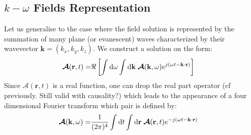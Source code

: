 \subsection{$k-\omega$ Fields Representation}\label{sec:spectralRepresentation}
Let us generalise to the case where the field solution is represented by the summation of many plane (or evanescent) waves characterized by their wavevector $\mathbf{k}=(k_x, k_y, k_z)$. We construct a solution on the form: 	
\begin{subequations}
	\begin{align}
	\boldsymbol{\mathcal{A}}(\mathbf{r}, t) =& \Re \left[
	\int \mathop{}\!\mathrm{d} \omega \int \mathop{}\!\mathrm{d} \mathbf{k} \;
	\mathbf{\boldsymbol{\mathcal{A}}}(\mathbf{k}, \omega) e^{j(\omega t - \mathbf{k}\cdot\mathbf{r})}
	\right]
	\end{align}
	\label{eq:k-spectralDefinition}
\end{subequations}
Since $\boldsymbol{\mathcal{A}}(\mathbf{r}, t)$ is a real function, one can drop the real part operator (cf previously. Still valid with causality?) which leads to the appearance of a four dimensional Fourier transform which pair is defined by:
 \begin{subequations}
 	\begin{align}
 	\boldsymbol{\mathcal{A}}(\mathbf{k}, \omega) =& 
 	\frac{1}{(2\pi)^4}
 	\int \mathop{}\!\mathrm{d} t \int \mathop{}\!\mathrm{d} \mathbf{r} \;
 	\mathbf{\boldsymbol{\mathcal{A}}}(\mathbf{r}, t) e^{-j(\omega t - \mathbf{k}\cdot\mathbf{r})}
 	\end{align}
 \end{subequations}

